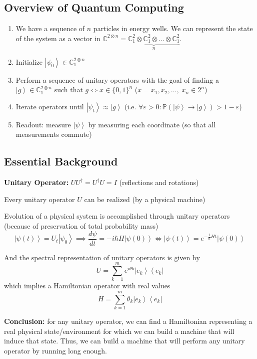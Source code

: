 \documentclass[12pt]{article}
\renewcommand{\P}{\mathbb{P}}
\newcommand{\C}{\mathbb{C}}
\newcommand{\bra}[1]{\left\langle #1 \right\vert }
\newcommand{\ket}[1]{\left\vert #1 \right\rangle}
\begin{document}
    \subsection*{Overview of Quantum Computing}
        \begin{enumerate}
            \item  We have a sequence of $n$ particles in energy wells. We can represent the state of the system as a vector in $\C^{2\otimes n} = \underbrace{\C_1^2 \otimes \C_1^2 \otimes \dots \otimes \C_1^2}_n$.
            \item Initialize $\ket{\psi_0} \in \C_1^{2\otimes n}$
            \item Perform a sequence of unitary operators with the goal of finding a $\ket{g} \in \C_1^{2\otimes n}$ such that $g \iff x \in \{0, 1\}^n$ ($x = x_1, x_2, \dots,\; x_n \in 2^n$)
            \item Iterate operators until $\ket{\psi_t} \approx \ket{g}$ (i.e. $\forall \varepsilon > 0: \P(\ket{\psi} \to \ket{g}) > 1 - \varepsilon$)
            \item Readout: measure $\ket{\psi}$ by measuring each coordinate (so that all measurements commute)
        \end{enumerate}
       
    \subsection*{Essential Background}
        \textbf{Unitary Operator:} $UU^\dagger = U^\dagger U = I$ (reflections and rotations)

        Every unitary operator $U$ can be realized (by a physical machine) 

        Evolution of a physical system is accomplished through unitary operators (because of preservation of total probability mass)
        \[\ket{\psi(t)} = U_t\ket{\psi_0} \implies \frac{d\psi}{dt} = -i\hbar H\ket{\psi(0)} \iff \ket{\psi(t)} = e^{-\frac{i}{\hbar}Ht}\ket{\psi(0)}\]

        And the spectral representation of unitary operators is given by 
        \[U = \sum_{k=1}^m e^{i\theta k}\ket{e_k}\bra{e_k}\]
        which implies a Hamiltonian operator with real values 
        \[H = \sum_{k=1}^m \theta_k \ket{e_k}\bra{e_k}\]

        \textbf{Conclusion:} for any unitary operator, we can find a Hamiltonian representing a real physical state/environment for which we can build a machine that will induce that state. Thus, we can build a machine that will perform any unitary operator by running long enough.
\end{document}

